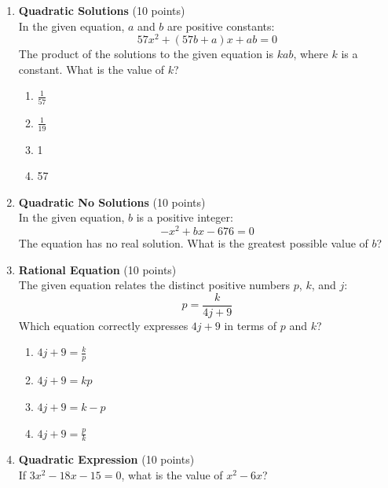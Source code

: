\begin{enumerate}
  \newpage

  \item \textbf{Quadratic Solutions} (10 points)\\
  In the given equation, $a$ and $b$ are positive constants:
  \[
    57x^{2}+(57b+a)x+ab=0
  \]
  The product of the solutions to the given equation is $kab$, where $k$ is a constant. What is the value of $k$?
  \begin{enumerate}[label=(\Alph*)]
    \item $\frac{1}{57}$
    \item $\frac{1}{19}$
    \item 1
    \item 57
  \end{enumerate}
  \begin{subanswer}
  \end{subanswer}

  \item \textbf{Quadratic No Solutions} (10 points)\\
  In the given equation, $b$ is a positive integer:
  \[
    -x^{2}+bx-676=0
  \]
  The equation has no real solution. What is the greatest possible value of $b$?
  \begin{subanswer}
  \end{subanswer}

  \item \textbf{Rational Equation} (10 points)\\
  The given equation relates the distinct positive numbers $p$, $k$, and $j$:
  \[
    p=\frac{k}{4j+9}
  \]
  Which equation correctly expresses $4j+9$ in terms of $p$ and $k$?
  \begin{enumerate}[label=(\Alph*)]
    \item $4j+9=\frac{k}{p}$
    \item $4j+9=kp$
    \item $4j+9=k-p$
    \item $4j+9=\frac{p}{k}$
  \end{enumerate}
  \begin{subanswer}
  \end{subanswer}

  \item \textbf{Quadratic Expression} (10 points)\\
  If $3x^{2}-18x-15=0$, what is the value of $x^{2}-6x$?
  \begin{subanswer}
  \end{subanswer}


\end{enumerate}
